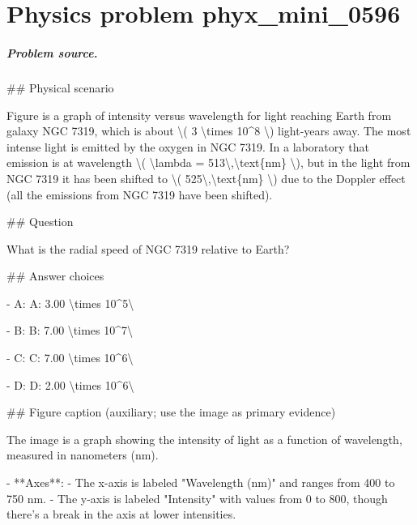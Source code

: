 
\chapter{Physics problem phyx\_mini\_0596}
\label{ch:PhyXMiniProblems_problem_phyx_mini_0596}

\paragraph{Problem source.}
\#\# Physical scenario

Figure is a graph of intensity versus wavelength for light reaching Earth from galaxy NGC 7319, which is about \textbackslash{}( 3 \textbackslash{}times 10\textasciicircum{}8 \textbackslash{}) light-years away. The most intense light is emitted by the oxygen in NGC 7319. In a laboratory that emission is at wavelength \textbackslash{}( \textbackslash{}lambda = 513\textbackslash{},\textbackslash{}text\{nm\} \textbackslash{}), but in the light from NGC 7319 it has been shifted to \textbackslash{}( 525\textbackslash{},\textbackslash{}text\{nm\} \textbackslash{}) due to the Doppler effect (all the emissions from NGC 7319 have been shifted).

\#\# Question

What is the radial speed of NGC 7319 relative to Earth?

\#\# Answer choices

- A: A: 3.00 \textbackslash{}times 10\textasciicircum{}5\textbackslash{}

- B: B: 7.00 \textbackslash{}times 10\textasciicircum{}7\textbackslash{}

- C: C: 7.00 \textbackslash{}times 10\textasciicircum{}6\textbackslash{}

- D: D: 2.00 \textbackslash{}times 10\textasciicircum{}6\textbackslash{}

\#\# Figure caption (auxiliary; use the image as primary evidence)

The image is a graph showing the intensity of light as a function of wavelength, measured in nanometers (nm). 

- **Axes**: 
  - The x-axis is labeled "Wavelength (nm)" and ranges from 400 to 750 nm.
  - The y-axis is labeled "Intensity" with values from 0 to 800, though there's a break in the axis at lower intensities.

